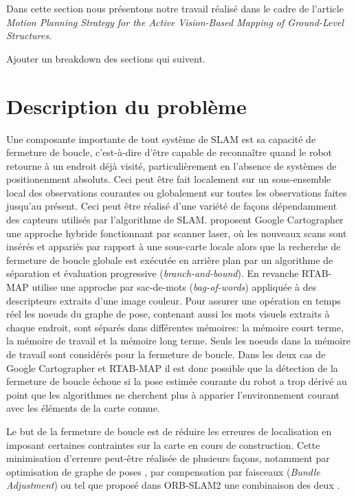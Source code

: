 \label{sec:ugv}

Dans cette section nous présentons notre travail réalisé dans le cadre de l'article \textit{Motion Planning Strategy for the Active Vision-Based Mapping of Ground-Level Structures}.

\color{red}
Ajouter un breakdown des sections qui suivent.
\color{black}

\section{Description du problème}
Une composante importante de tout système de SLAM est sa capacité de fermeture de boucle, c'est-à-dire d'être capable de reconnaître quand le robot retourne à un endroit déjà visité, particulièrement en l'absence de systèmes de positionenment absoluts. Ceci peut être fait localement sur un sous-ensemble local des observations courantes ou globalement sur toutes les observations faites jusqu'au présent. Ceci peut être réalisé d'une variété de façons dépendamment des capteurs utilisés par l'algorithme de SLAM. \citep{Hess2016} proposent Google Cartographer une approche hybride fonctionnant par scanner laser, où les nouveaux scans sont insérés et appariés par rapport à une sous-carte locale alors que la recherche de fermeture de boucle globale est exécutée en arrière plan par un algorithme de séparation et évaluation progressive (\textit{branch-and-bound}). En revanche RTAB-MAP \citep{Labbe2014} utilise une approche par sac-de-mots (\textit{bag-of-words}) appliquée à des descripteurs extraits d'une image couleur. Pour assurer une opération en temps réel les noeuds du graphe de pose, contenant aussi les mots visuels extraits à chaque endroit, sont séparés dans différentes mémoires: la mémoire court terme, la mémoire de travail et la mémoire long terme. Seuls les noeuds dans la mémoire de travail sont considérés pour la fermeture de boucle. Dans les deux cas de Google Cartographer et RTAB-MAP il est donc possible que la détection de la fermeture de boucle échoue si la pose estimée courante du robot a trop dérivé au point que les algorithmes ne cherchent plus à apparier l'environnement courant avec les éléments de la carte connue.

Le but de la fermeture de boucle est de réduire les erreures de localisation en imposant certaines contraintes sur la carte en cours de construction. Cette minimisation d'erreure peut-être réalisée de plusieurs façons, notamment par optimisation de graphe de poses \citep{Carlone2016}, par compensation par faisceaux (\textit{Bundle Adjustment}) \citep{Mei2011} ou tel que proposé dans ORB-SLAM2 une combinaison des deux \citep{Mur-Artal2017}.

